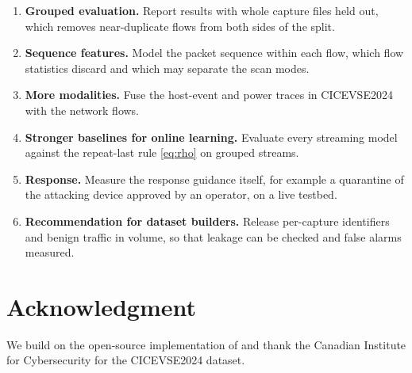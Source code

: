 \documentclass[conference]{IEEEtran}
\begin{document}
\begin{enumerate}
    \item \textbf{Grouped evaluation.} Report results with whole capture files held out, which removes near-duplicate flows from both sides of the split.
    \item \textbf{Sequence features.} Model the packet sequence within each flow, which flow statistics discard and which may separate the scan modes.
    \item \textbf{More modalities.} Fuse the host-event and power traces in CICEVSE2024 with the network flows.
    \item \textbf{Stronger baselines for online learning.} Evaluate every streaming model against the repeat-last rule \eqref{eq:rho} on grouped streams.
    \item \textbf{Response.} Measure the response guidance itself, for example a quarantine of the attacking device approved by an operator, on a live testbed.
    \item \textbf{Recommendation for dataset builders.} Release per-capture identifiers and benign traffic in volume, so that leakage can be checked and false alarms measured.
\end{enumerate}

\section*{Acknowledgment}

We build on the open-source implementation of \cite{b4} and thank the Canadian Institute for Cybersecurity for the CICEVSE2024 dataset.
\end{document}
